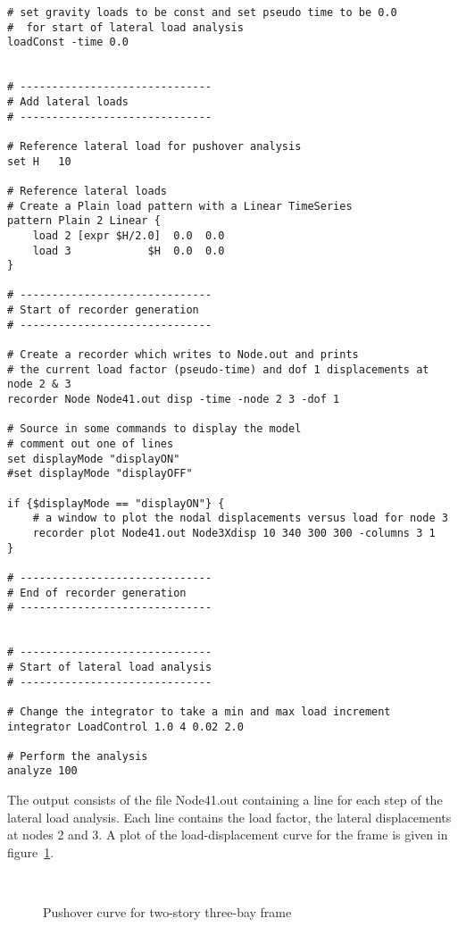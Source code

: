 \documentclass[12pt]{article}
\begin{document}
{\begin{verbatim}
# set gravity loads to be const and set pseudo time to be 0.0
#  for start of lateral load analysis
loadConst -time 0.0


# ------------------------------
# Add lateral loads 
# ------------------------------

# Reference lateral load for pushover analysis
set H   10

# Reference lateral loads
# Create a Plain load pattern with a Linear TimeSeries
pattern Plain 2 Linear {
    load 2 [expr $H/2.0]  0.0  0.0
    load 3            $H  0.0  0.0
}

# ------------------------------
# Start of recorder generation
# ------------------------------

# Create a recorder which writes to Node.out and prints
# the current load factor (pseudo-time) and dof 1 displacements at node 2 & 3
recorder Node Node41.out disp -time -node 2 3 -dof 1

# Source in some commands to display the model
# comment out one of lines
set displayMode "displayON"
#set displayMode "displayOFF"

if {$displayMode == "displayON"} {
    # a window to plot the nodal displacements versus load for node 3
    recorder plot Node41.out Node3Xdisp 10 340 300 300 -columns 3 1
}

# ------------------------------
# End of recorder generation
# ------------------------------


# ------------------------------
# Start of lateral load analysis
# ------------------------------

# Change the integrator to take a min and max load increment
integrator LoadControl 1.0 4 0.02 2.0

# Perform the analysis
analyze 100
\end{verbatim}
}


\vspace{0.2in} 

The output consists of the file Node41.out containing a line for each
step of the lateral load analysis. Each line contains the load factor,
the lateral displacements at nodes 2 and 3. A plot of the
load-displacement curve for the frame is given in
figure~\ref{twostory}.   

\begin{figure}[htpb]
\begin{center}
\leavevmode
\hbox{%
\epsfxsize=5.5in
}
\end{center}
\caption{Pushover curve for two-story three-bay frame}
\label{twostory}
\end{figure}
\end{document}
